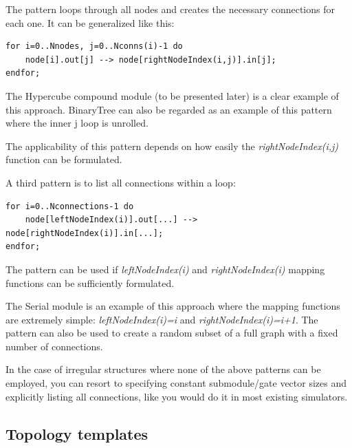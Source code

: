 

The pattern loops through all nodes and creates the necessary
connections for each one. It can be generalized like this:


\begin{Verbatim}[commandchars=\\\{\}]
for i=0..Nnodes, j=0..Nconns(i)-1 do
    node[i].out[j] --> node[rightNodeIndex(i,j)].in[j];
endfor;
\end{Verbatim}



The Hypercube compound module (to be
presented later) is a clear example of this approach. BinaryTree can
also be regarded as an example of this pattern where the inner j loop
is unrolled.

The applicability of this pattern depends on how easily the \textit{rightNodeIndex(i,j)}
function can be formulated.




A third pattern is to list all connections within a loop:


\begin{Verbatim}[commandchars=\\\{\}]
for i=0..Nconnections-1 do
    node[leftNodeIndex(i)].out[...] --> node[rightNodeIndex(i)].in[...];
endfor;
\end{Verbatim}



The pattern can be used if \textit{leftNodeIndex(i)} and \textit{rightNodeIndex(i)}
mapping functions can be sufficiently formulated.

The Serial module is an example of this approach where the mapping
functions are extremely simple: \textit{leftNodeIndex(i)=i} and \textit{rightNodeIndex(i)=i+1}.
The pattern can also be used to create a random subset of a full
graph with a fixed number of connections.

In the case of irregular structures where none of the above patterns
can be employed, you can resort to specifying constant submodule/gate
vector sizes and explicitly listing all connections, like you
would do it in most existing simulators.





\subsection{Topology templates}
\label{sec:ch-ned-lang:topology-templates}



